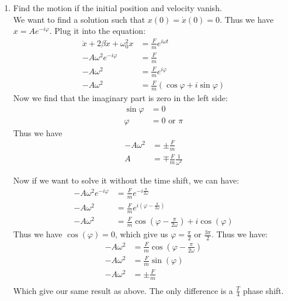 \documentclass{article}
\begin{document}
\begin{enumerate}
\begin{enumerate}
        \item Find the motion if the initial position and velocity vanish.\\

        We want to find a solution such that $x(0) = \dot{x}(0) = 0$. Thus we have $x = Ae^{-i\varphi}$. Plug it into the equation:
        \begin{align*}
            \ddot{x} + 2\beta \dot{x} + \omega_0^2 x &= \frac{F}{m} e^{i\omega t} \\
            -A\omega^2 e^{-i\varphi}  &= \frac{F}{m}\\
            -A\omega^2 &= \frac{F}{m} e^{i\varphi}\\
            -A\omega^2 &= \frac{F}{m} (\cos\varphi + i \sin\varphi)
        \end{align*}
        Now we find that the imaginary part is zero in the left side:
        \begin{align*}
            \sin\varphi &= 0 \\
            \varphi &= 0 \,\, \text{or} \,\,\pi
        \end{align*}
        Thus we have
        \begin{align*}
            -A\omega^2 &= \pm \frac{F}{m} \\
            A &= \mp \frac{F}{m} \frac{1}{\omega^2}
        \end{align*}

        Now if we want to solve it without the time shift, we can have:
        \begin{align*}
            -A\omega^2 e^{-i\varphi}  &= \frac{F}{m} e^{-i\frac{\pi}{2\omega}} \\
            -A\omega^2 &= \frac{F}{m} e^{i(\varphi - \frac{\pi}{2\omega})} \\
            -A\omega^2 &= \frac{F}{m} \cos(\varphi - \frac{\pi}{2\omega}) + i \cos(\varphi)
        \end{align*}
        Thus we have $\cos(\varphi) = 0$, which give us $\varphi = \frac{\pi}{2}$ or $\frac{3\pi}{2}$. Thus we have:
        \begin{align*}
            -A\omega^2 &= \frac{F}{m} \cos(\varphi - \frac{\pi}{2\omega}) \\
            -A\omega^2 &= \frac{F}{m} \sin(\varphi)\\
            -A\omega^2 &= \pm\frac{F}{m} \\
        \end{align*}
        Which give our same result as above. The only difference is a $\frac{T}{4}$ phase shift.



\end{enumerate}
\end{enumerate}
\end{document}
